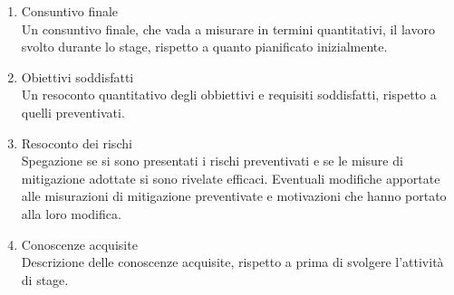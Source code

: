 \begin{enumerate}
    \item Consuntivo finale \\
    Un consuntivo finale, che vada a misurare in termini quantitativi,
    il lavoro svolto durante lo stage, rispetto a quanto pianificato
    inizialmente.

    \item Obiettivi soddisfatti \\
    Un resoconto quantitativo degli obbiettivi e requisiti soddisfatti, 
    rispetto a quelli preventivati.

    \item Resoconto dei rischi \\
    Spegazione se si sono presentati i rischi preventivati e se le misure 
    di mitigazione adottate si sono rivelate efficaci. Eventuali modifiche
    apportate alle misurazioni di mitigazione preventivate e motivazioni 
    che hanno portato alla loro modifica.

    \item Conoscenze acquisite \\
    Descrizione delle conoscenze acquisite, rispetto a prima di svolgere
    l'attività di stage.
\end{enumerate}
